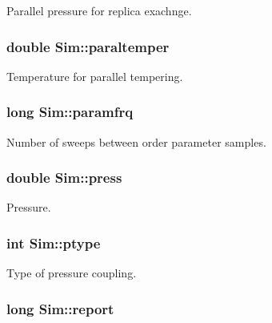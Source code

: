 Parallel pressure for replica exachnge. 

\hypertarget{class_sim_a216b84935ba38ff57f3bd3f13b2c2b20}{
\subsubsection[{paraltemper}]{\setlength{\rightskip}{0pt plus 5cm}double Sim\+::paraltemper}}\label{class_sim_a216b84935ba38ff57f3bd3f13b2c2b20}


Temperature for parallel tempering. 

\hypertarget{class_sim_acc700b6bf4b51dae5604a8480a8054c9}{
\subsubsection[{paramfrq}]{\setlength{\rightskip}{0pt plus 5cm}long Sim\+::paramfrq}}\label{class_sim_acc700b6bf4b51dae5604a8480a8054c9}


Number of sweeps between order parameter samples. 

\hypertarget{class_sim_a2d0641585ed0c114d119b0e0a4fbafef}{
\subsubsection[{press}]{\setlength{\rightskip}{0pt plus 5cm}double Sim\+::press}}\label{class_sim_a2d0641585ed0c114d119b0e0a4fbafef}


Pressure. 

\hypertarget{class_sim_a85e257bc2ae8a9e328798ddeb776fc3f}{
\subsubsection[{ptype}]{\setlength{\rightskip}{0pt plus 5cm}int Sim\+::ptype}}\label{class_sim_a85e257bc2ae8a9e328798ddeb776fc3f}


Type of pressure coupling. 

\hypertarget{class_sim_a7ff9e858e99db9ed0d65107f892d7447}{
\subsubsection[{report}]{\setlength{\rightskip}{0pt plus 5cm}long Sim\+::report}}\label{class_sim_a7ff9e858e99db9ed0d65107f892d7447}


